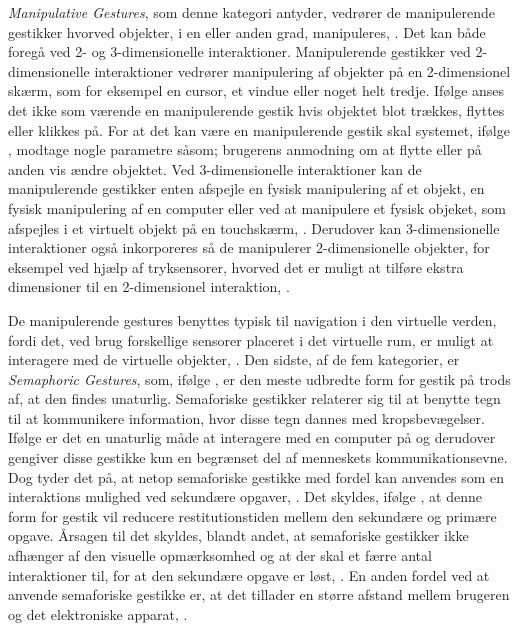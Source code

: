 \textit{Manipulative Gestures}, som denne kategori antyder, vedrører de manipulerende gestikker hvorved objekter, i en eller anden grad, manipuleres, \parencite[s. 5]{PDF:ATaxonomyOfGestures}. Det kan både foregå ved 2- og 3-dimensionelle interaktioner. Manipulerende gestikker ved 2-dimensionelle interaktioner vedrører manipulering af objekter på en 2-dimensionel skærm, som for eksempel en cursor, et vindue eller noget helt tredje. Ifølge \textcite[s. 5]{PDF:ATaxonomyOfGestures} anses det ikke som værende en manipulerende gestik hvis objektet blot trækkes, flyttes eller klikkes på. For at det kan være en manipulerende gestik skal systemet, ifølge \textcite[s. 5]{PDF:ATaxonomyOfGestures}, modtage nogle parametre såsom; brugerens anmodning om at flytte eller på anden vis ændre objektet. Ved 3-dimensionelle interaktioner kan de manipulerende gestikker enten afspejle en fysisk manipulering af et objekt, en fysisk manipulering af en computer eller ved at manipulere et fysisk objeket, som afspejles i et virtuelt objekt på en touchskærm, \parencite[s. 6]{PDF:ATaxonomyOfGestures}. Derudover kan 3-dimensionelle interaktioner også inkorporeres så de manipulerer 2-dimensionelle objekter, for eksempel ved hjælp af tryksensorer, hvorved det er muligt at tilføre ekstra dimensioner til en 2-dimensionel interaktion, \parencite[s. 5]{PDF:ATaxonomyOfGestures}. 

De manipulerende gestures benyttes typisk til navigation i den virtuelle verden, fordi det, ved brug forskellige sensorer placeret i det virtuelle rum, er muligt at interagere med de virtuelle objekter, \parencite[ss. 14-15]{PDF:ATaxonomyOfGestures}.\blankline
%
Den sidste, af de fem kategorier, er \textit{Semaphoric Gestures}, som, ifølge \textcite[s. 6]{PDF:ATaxonomyOfGestures}, er den meste udbredte form for gestik på trods af, at den findes unaturlig. Semaforiske gestikker relaterer sig til at benytte tegn til at kommunikere information, hvor disse tegn dannes med kropsbevægelser. Ifølge \textcite[s. 1961]{PDF:AStudyOnTheUseOfSemaphoricGestures} er det en unaturlig måde at interagere med en computer på og derudover gengiver disse gestikke kun en begrænset del af menneskets kommunikationsevne. Dog tyder det på, at netop semaforiske gestikke med fordel kan anvendes som en interaktions mulighed ved sekundære opgaver, \parencite[s. 1961]{PDF:AStudyOnTheUseOfSemaphoricGestures}. Det skyldes, ifølge \textcite[s. 1964]{PDF:AStudyOnTheUseOfSemaphoricGestures}, at denne form for gestik vil reducere restitutionstiden mellem den sekundære og primære opgave. Årsagen til det skyldes, blandt andet, at semaforiske gestikker ikke afhænger af den visuelle opmærksomhed og at der skal et færre antal interaktioner til, for at den sekundære opgave er løst, \parencite[s. 1964]{PDF:AStudyOnTheUseOfSemaphoricGestures}. En anden fordel ved at anvende semaforiske gestikke er, at det tillader en større afstand mellem brugeren og det elektroniske apparat, \parencite[s. 6]{PDF:ATaxonomyOfGestures}.    

